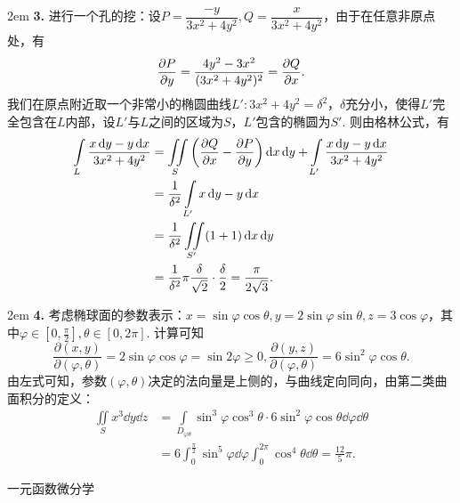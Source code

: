 \documentclass[UTF8,14pt,normal]{ctexart}
\begin{document}
    \hangindent 2em
    \noindent
    \textbf{3.}
    进行一个孔的挖：设\(P=\dfrac{-y}{3x^2+4y^2},Q=\dfrac{x}{3x^2+4y^2}\)，由于在任意非原点处，有\[\pdv{P}{y} = \frac{4y^2-3x^2}{(3x^2+4y^2)^2} = \pdv{Q}{x}.\]
    我们在原点附近取一个非常小的椭圆曲线\(L'\colon 3x^2+4y^2 = \delta^2\)，\(\delta\)充分小，使得\(L'\)完全包含在\(L\)内部，设\(L'\)与\(L\)之间的区域为\(S\)，\(L'\)包含的椭圆为\(S'\). 则由格林公式，有
    \begin{equation*}
        \begin{split}
            \int\limits_{L}\frac{x\dd{y}-y\dd{x}}{3x^2+4y^2} &= \iint\limits_{S}\left(\pdv{Q}{x}-\pdv{P}{y}\right)\dd{x}\dd{y} +\int\limits_{L'}\frac{x\dd{y}-y\dd{x}}{3x^2+4y^2} \\
            &= \frac{1}{\delta^2}\int\limits_{L'}x\dd{y}-y\dd{x}\\
            &= \frac{1}{\delta^2}\iint\limits_{S'}(1+1)\dd{x}\dd{y}\\
            &= \frac{1}{\delta^2}\pi\frac{\delta}{\sqrt{2}} \cdot \frac{\delta}{2} = \frac{\pi}{2\sqrt{3}}.
        \end{split}
    \end{equation*}

    \hangindent 2em
    \noindent
    \textbf{4.}
    考虑椭球面的参数表示：\(x = \sin\varphi\cos\theta, y = 2\sin\varphi\sin\theta, z = 3\cos\varphi\)，其中\(\varphi\in[0,\frac{\pi}{2}],\theta\in[0,2\pi]\).
    计算可知\[\frac{\partial(x,y)}{\partial(\varphi,\theta)} = 2\sin\varphi\cos\varphi = \sin 2\varphi\geqslant0,\frac{\partial (y,z)}{\partial(\varphi,\theta)} = 6\sin^2\varphi\cos\theta.\]
    由左式可知，参数\((\varphi,\theta)\)决定的法向量是上侧的，与曲线定向同向，由第二类曲面积分的定义：
    \begin{equation*}
        \begin{split}
            \iint\limits_{S}x^3\dd{y}\dd{z} &=\int\limits_{D_{\varphi\theta}}\sin^3\varphi\cos^3\theta\cdot 6\sin^2\varphi\cos\theta\dd{\varphi}\dd{\theta}\\
            &= 6\int_{0}^{\frac{\pi}{2}}\sin^5\varphi\dd{\varphi}\int_{0}^{2\pi}\cos^4\theta\dd{\theta} = \frac{12}{5}\pi.
        \end{split}
    \end{equation*}

 一元函数微分学
\end{document}
